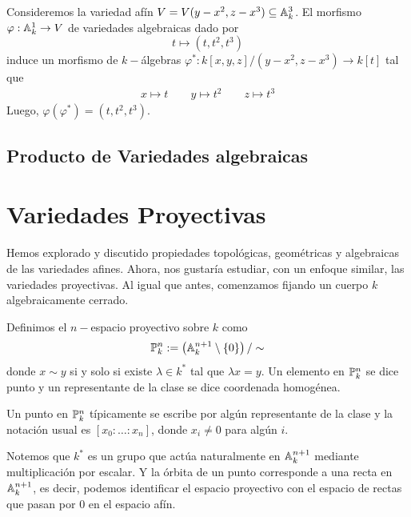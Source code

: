 \documentclass[11pt]{article}
\begin{document}
\begin{ejm}
    Consideremos la variedad afín $V=V(y-x^{2},z-x^{3})\subseteq\A_{k}^{3}$. El morfismo
    $\varphi:\A_{k}^{1}\to V$ de variedades algebraicas dado por
    \begin{equation*}
        t\mapsto (t,t^{2},t^{3})
    \end{equation*}
    induce un morfismo de $k-$álgebras $\varphi^{*}:k[x,y,z]/(y-x^{2},z-x^{3})\to k[t]$ tal que
    \begin{gather*}
        x\mapsto t \qquad y\mapsto t^{2} \qquad z\mapsto t^{3}
    \end{gather*}
    Luego, $\varphi(\varphi^{*})=(t,t^{2},t^{3})$.
\end{ejm}

\newpage

\subsection{Producto de Variedades algebraicas} %

\newpage

\section{Variedades Proyectivas} %

\noindent Hemos explorado y discutido propiedades topológicas, geométricas y algebraicas de las
variedades afines. Ahora, nos gustaría estudiar, con un enfoque similar, las variedades 
proyectivas. Al igual que antes, comenzamos fijando un cuerpo $k$ algebraicamente cerrado.

\begin{dfn}
    Definimos el $n-$espacio proyectivo sobre $k$ como
    \begin{equation*}
        \P_{k}^{n}:=\left(\A_{k}^{n+1}\setminus\{0\}\right)/\sim
    \end{equation*}
    donde $x\sim y$ si y solo si existe $\lambda\in k^{*}$ tal que $\lambda x=y$. Un elemento en
    $\P_{k}^{n}$ se dice punto y un representante de la clase se dice coordenada homogénea.
\end{dfn}

\obs Un punto en $\P_{k}^{n}$ típicamente se escribe por algún representante de la clase y la 
notación usual es $[x_{0}:\dots:x_{n}]$, donde $x_{i}\neq0$ para algún $i$.

\vspace{1mm}
\noindent Notemos que $k^{*}$ es un grupo que actúa naturalmente en $\A_{k}^{n+1}$ mediante 
multiplicación por escalar. Y la órbita de un punto corresponde a una recta en $\A_{k}^{n+1}$, es
decir, podemos identificar el espacio proyectivo con el espacio de rectas que pasan por $0$ en el
espacio afín.
\end{document}
